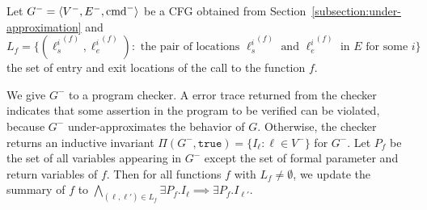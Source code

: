 Let $G^- = \langle V^-, E^-, \textmd{cmd}^- \rangle$ be a CFG obtained from Section~\ref{subsection:under-approximation} and $L_f=\{({\ell_s^i}^{(f)},{\ell_e^i}^{(f)}):\mbox{ the pair of locations }{\ell_s^i}^{(f)}\mbox{ and }{\ell_e^i}^{(f)}\mbox{ in }E\mbox{ for some }i\}$ the set of entry and exit locations of the call to the function $f$.

We give $G^-$ to a program checker. A error trace returned from the checker indicates that some assertion in the program to be verified can be violated, because $G^-$ under-approximates the behavior of $G$. Otherwise, the checker returns an inductive invariant $\Pi (G^-, \mathtt{true})= \{ I_\ell : \ell \in V^-
\}$ for $G^-$. Let $P_f$ be the set of all variables appearing in $G^-$ except the set of formal parameter and return variables of $f$.
Then for all functions $f$ with $L_f\neq \emptyset$, we update the summary of $f$ to $\bigwedge_{(\ell,\ell')\in L_f} \exists P_f. I_\ell \implies \exists P_f.I_{\ell'}$.
